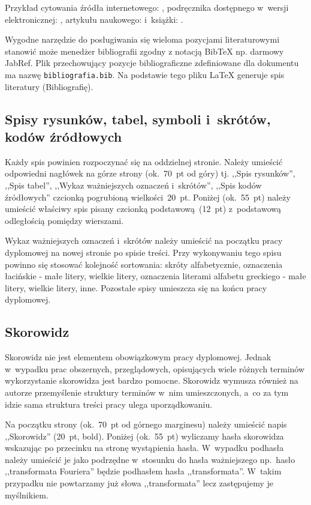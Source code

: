\documentclass[skorowidz,skroty]{dyplomWEZUT}
\begin{document}
Przykład cytowania źródła internetowego: \cite{Chwalowski2002}, podręcznika dostępnego w~wersji elektronicznej: \cite{Nowacki1996,Reckdahl1997}, artykułu naukowego: \cite{Iksinski2000} i~książki: \cite{Honczarenko2000,Opoka2001}.

Wygodne narzędzie do posługiwania się wieloma pozycjami literaturowymi stanowić może menedżer bibliografii zgodny z notacją BibTeX np. darmowy JabRef. Plik przechowujący pozycje bibliograficzne zdefiniowane dla dokumentu ma nazwę \lstinline|bibliografia.bib|. Na podstawie tego pliku LaTeX generuje spis literatury (Bibliografię). 

\subsection{Spisy rysunków, tabel, symboli i~skrótów, kodów źródłowych}

Każdy spis powinien rozpoczynać się na oddzielnej stronie. Należy umieścić odpowiedni nagłówek na górze strony (ok.~70~pt od góry) tj. ,,Spis rysunków'', ,,Spis tabel'', ,,Wykaz ważniejszych oznaczeń i~skrótów'', ,,Spis kodów źródłowych'' czcionką pogrubioną wielkości~20~pt. Poniżej (ok.~55~pt) należy umieścić właściwy spis pisany czcionką podstawową~(12~pt) z~podstawową odległością pomiędzy wierszami.

Wykaz ważniejszych oznaczeń i~skrótów należy umieścić na początku pracy dyplomowej na nowej stronie po spisie treści. Przy wykonywaniu tego spisu powinno się stosować kolejność sortowania: skróty alfabetycznie, oznaczenia łacińskie - małe litery, wielkie litery, oznaczenia literami alfabetu greckiego - małe litery, wielkie litery, inne. Pozostałe spisy umieszcza się na końcu pracy dyplomowej.

\subsection{Skorowidz}

Skorowidz nie jest elementem obowiązkowym pracy dyplomowej. Jednak w~wypadku prac obszernych, przeglądowych, opisujących wiele różnych terminów wykorzystanie skorowidza jest bardzo pomocne. Skorowidz wymusza również na autorze przemyślenie struktury terminów w~nim umieszczonych, a~co za tym idzie sama struktura treści pracy ulega uporządkowaniu.

Na początku strony (ok.~70~pt od górnego marginesu) należy umieścić napis ,,Skorowidz'' (20~pt, bold). Poniżej (ok.~55~pt) wyliczamy hasła skorowidza wskazując po przecinku na stronę wystąpienia hasła. W~wypadku podhasła należy umieścić je jako podrzędne w~stosunku do hasła ważniejszego np.~hasło ,,transformata Fouriera'' będzie podhasłem hasła ,,transformata''. W~takim przypadku nie powtarzamy już słowa ,,transformata'' lecz zastępujemy je myślnikiem.
\end{document}
